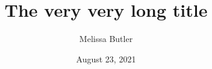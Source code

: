 \documentclass{beamer}
\title[Short title]{The very very long title}
\author[Melissa Butler]{Melissa Butler}
\institute[UWyo]{University of Wyoming}
\date{August 23, 2021}
\begin{document}
\begin{frame}
\maketitle
\end{frame}


\end{document}
